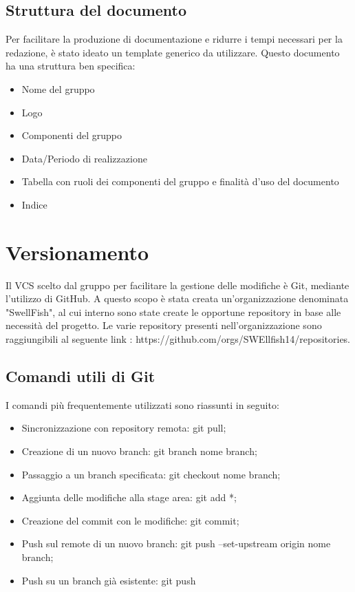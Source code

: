 \documentclass[12pt]{article}
\begin{document}
\subsection{Struttura del documento}
Per facilitare la produzione di documentazione e ridurre i tempi necessari per la redazione, è stato ideato un template generico da utilizzare.
Questo documento ha una struttura ben specifica:
\begin{itemize}
    \item Nome del gruppo
    \item Logo 
    \item Componenti del gruppo
    \item Data/Periodo di realizzazione
    \item Tabella con ruoli dei componenti del gruppo e finalità d'uso del documento
    \item Indice
\end{itemize}
\section{Versionamento}
Il VCS scelto dal gruppo per facilitare la gestione delle modifiche è Git, mediante l'utilizzo di GitHub.
A questo scopo è stata creata un'organizzazione denominata "SwellFish", al cui interno sono state create le opportune repository in base alle necessità del progetto.
Le varie repository presenti nell'organizzazione sono raggiungibili al seguente link : https://github.com/orgs/SWEllfish14/repositories.

\subsection{Comandi utili di Git}
I comandi più frequentemente utilizzati sono riassunti in seguito:
\begin{itemize}
    \item Sincronizzazione con repository remota: git pull;
    \item Creazione di un nuovo branch: git branch nome branch;
    \item Passaggio a un branch specificata: git checkout nome branch;
    \item Aggiunta delle modifiche alla stage area: git add *;
    \item Creazione del commit con le modifiche: git commit;
    \item Push sul remote di un nuovo branch: git push --set-upstream origin nome branch;
    \item Push su un branch già esistente: git push
\end{itemize}
\end{document}

